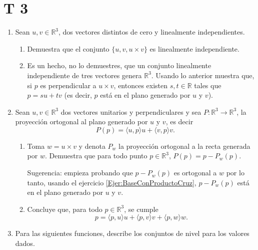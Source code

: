 \documentclass{article}
\theoremstyle{definition}
\begin{document}
  \section*{T 3}


\begin{enumerate}

\item\label{Ejer:BaseConProductoCruz} Sean $u,v\in \mathbb{R}^3$, dos vectores distintos de cero y linealmente
  independientes.

\begin{enumerate}
\item Demuestra que el conjunto
  $\{u,v, u\times v\}$ es linealmente independiente.
  \item Es un hecho, no lo demuestres, que un conjunto linealmente independiente de tres vectores genera
  $\mathbb{R}^3$. Usando lo anterior muestra que, si $p$ es perpendicular a $u\times v$, entonces existen
  $s,t\in \mathbb{R}$ tales que $p=su+tv$ (es decir, $p$ est\'a en el plano generado por $u$ y $v$).
  
  \end{enumerate}

\item Sean $u,v\in \mathbb{R}^3$ dos vectores unitarios y perpendiculares y sea $P:\mathbb{R}^3 \to \mathbb{R}^3$,
la proyecci\'on ortogonal al plano generado por $u$ y $v$, es decir
$$
P(p)= \langle u,p\rangle u + \langle v, p \rangle v.
$$

\begin{enumerate}
\item Toma $w=u\times v$ y denota $P_w$ la proyecci\'on ortogonal a la recta generada por $w$. Demuestra que para todo punto $p\in \mathbb{R}^3$, $P(p)=p-P_{w}(p)$. 
	
	Sugerencia: empieza probando que $p-P_w(p)$ es ortogonal a $w$ por lo tanto, usando el ejercicio \ref{Ejer:BaseConProductoCruz}, $p-P_w(p)$ est\'a en el plano generado por $u$ y $v$.


\item Concluye que,  para todo
$p\in \mathbb{R}^3$, se cumple
$$
p=\langle p, u \rangle u + \langle p, v \rangle v + \langle p, w \rangle w.
$$
\end{enumerate}

\item Para las siguientes 	funciones, describe los conjuntos de nivel para los valores dados.
	

\end{enumerate}
\end{document}

